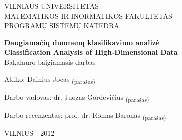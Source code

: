 \begin{titlepage}

\begin{center}
VILNIAUS UNIVERSITETAS\\
MATEMATIKOS IR INORMATIKOS FAKULTETAS\\
PROGRAMŲ SISTEMŲ KATEDRA\\
\vspace{150pt}

\huge \textbf{Daugiamačių duomenų klasifikavimo analizė\\}
\vspace{20pt}
\large\textbf{Classification Analysis of High-Dimensional Data\\}
\vspace{20pt}
\small Bakalauro baigiamasis darbas\\
\vspace{40pt}
\end{center} 


\begin{flushleft}
Atliko: \hspace{57pt} Dainius Jocas \hspace{125pt}\textsubscript{(para\v{s}as)}

\vspace{10pt}
Darbo vadovas: \hspace{14pt} dr. Juozas Gordevičius \hspace{76pt}\textsubscript{(para\v{s}as)}

\vspace{10pt}
Darbo recenzentas: prof. dr. Romas Baronas \hspace{66pt}\textsubscript{(para\v{s}as)}
\\
\vspace{130pt}
\end{flushleft}

\begin{center}
VILNIUS - 2012
\end{center}

\end{titlepage}